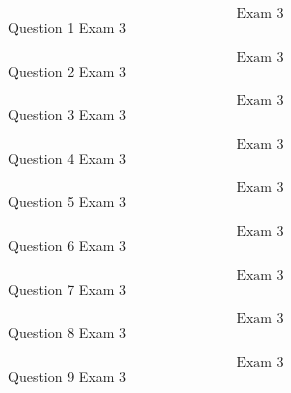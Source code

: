 \documentclass{article}
\begin{document}
    $$\text{Exam 3}$$
    Question 1 Exam 3\\
    \pagebreak

    $$\text{Exam 3}$$
    Question 2 Exam 3
    \pagebreak

    $$\text{Exam 3}$$
    Question 3 Exam 3
    \pagebreak

    $$\text{Exam 3}$$
    Question 4 Exam 3
    \pagebreak

    $$\text{Exam 3}$$
    Question 5 Exam 3
    \pagebreak

    $$\text{Exam 3}$$
    Question 6 Exam 3
    \pagebreak

    $$\text{Exam 3}$$
    Question 7 Exam 3
    \pagebreak

    $$\text{Exam 3}$$
    Question 8 Exam 3
    \pagebreak

    $$\text{Exam 3}$$
    Question 9 Exam 3
    \pagebreak
\end{document}
